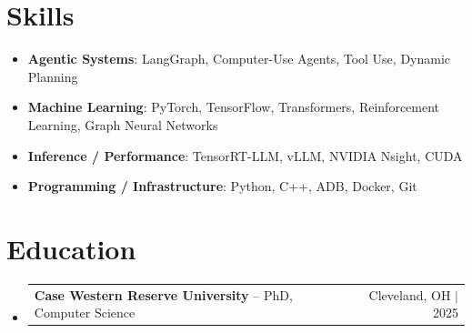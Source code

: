 \documentclass[letterpaper,13pt]{article}
\makeatletter
\newcommand{\resumeProjectHeading}[2]{
    \item
    \begin{tabular*}{\textwidth}{l@{\extracolsep{\fill}}r}
      \small#1 & #2 \\
    \end{tabular*}\vspace{-4pt}
}
\newcommand{\resumeSubHeadingListStart}{\begin{itemize}[leftmargin=0in, label={}]}
\newcommand{\resumeSubHeadingListEnd}{\end{itemize}}
\makeatother
\begin{document}
\section{Skills}
\vspace{0.02cm}
\begin{itemize}[leftmargin=0.15in, label={}, itemsep=2pt, topsep=1pt]
  \item \textbf{Agentic Systems}: LangGraph, Computer-Use Agents, Tool Use, Dynamic Planning
  \item \textbf{Machine Learning}: PyTorch, TensorFlow, Transformers, Reinforcement Learning, Graph Neural Networks
  \item \textbf{Inference / Performance}: TensorRT-LLM, vLLM, NVIDIA Nsight, CUDA
  \item \textbf{Programming / Infrastructure}: Python, C++, ADB, Docker, Git
\end{itemize}
\vspace{0.02cm}

\section{Education}
\resumeSubHeadingListStart
  \resumeProjectHeading{\textbf{Case Western Reserve University} -- PhD, Computer Science}{Cleveland, OH $|$ 2025}
\resumeSubHeadingListEnd
\end{document}
